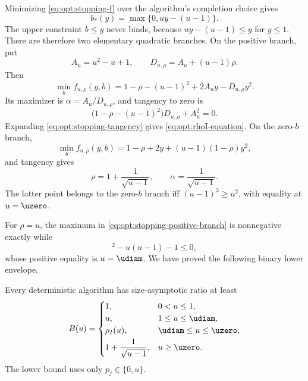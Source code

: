 Minimizing \cref{eq:opt:stopping-f} over the algorithm's completion choice
gives
\begin{equation}
 b_*(y)=\max\{0,uy-(u-1)\}.
 \label{eq:opt:bstar}
\end{equation}
The upper constraint $b\le y$ never binds, because
$uy-(u-1)\le y$ for $y\le1$.
There are therefore two elementary quadratic branches.  On the positive
branch, put
\begin{equation}
 A_u=u^2-u+1,
 \qquad
 D_{u,\rho}=A_u+(u-1)\rho.
\end{equation}
Then
\begin{equation}
 \min_b f_{u,\rho}(y,b)
 =1-\rho-(u-1)^2+2A_uy-D_{u,\rho}y^2.
 \label{eq:opt:stopping-positive-branch}
\end{equation}
Its maximizer is $\alpha=A_u/D_{u,\rho}$, and tangency to zero is
\begin{equation}
 \bigl(1-\rho-(u-1)^2\bigr)D_{u,\rho}+A_u^2=0.
 \label{eq:opt:stopping-tangency}
\end{equation}
Expanding \cref{eq:opt:stopping-tangency} gives
\cref{eq:opt:rhoI-equation}.  On the zero-$b$ branch,
\begin{equation}
 \min_b f_{u,\rho}(y,b)
 =1-\rho+2y+(u-1)(1-\rho)y^2,
\end{equation}
and tangency gives
\begin{equation}
 \rho=1+\frac1{\sqrt{u-1}},
 \qquad
 \alpha=\frac1{\sqrt{u-1}}.
 \label{eq:opt:zero-b-tangency}
\end{equation}
The latter point belongs to the zero-$b$ branch iff
$(u-1)^3\ge u^2$, with equality at $u=\uzero$.

For $\rho=u$, the maximum in
\cref{eq:opt:stopping-positive-branch} is nonnegative exactly while
\begin{equation}
 [u(u-1)]^2-u(u-1)-1\le0,
\end{equation}
whose positive equality is $u=\udiam$.  We have proved the following
binary lower envelope.

\begin{proposition}
\label{prop:opt:binary-lower}
Every deterministic algorithm has size-asymptotic ratio at least
\begin{equation}
 B(u)=
 \begin{cases}
 1,&0<u\le1,\\
 u,&1\le u\le \udiam,\\
 \rho_I(u),&\udiam\le u\le \uzero,\\[1mm]
 \displaystyle1+\frac1{\sqrt{u-1}},&u\ge \uzero.
 \end{cases}
 \label{eq:opt:binary-curve}
\end{equation}
The lower bound uses only $p_j\in\{0,u\}$.
\end{proposition}

